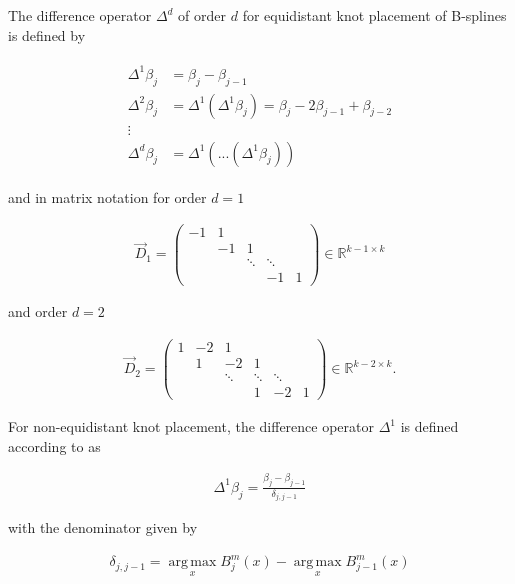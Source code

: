 \documentclass[10pt,a4paper]{report}
\begin{document}
The difference operator  $\Delta^d$ of order $d$ for equidistant knot placement of B-splines is defined by

\begin{align} \label{eq:difference-operators}
	\begin{split}
		\Delta^1 \beta_j &= \beta_j - \beta_{j-1} \\
		\Delta^2 \beta_j &= \Delta^1(\Delta^1 \beta_j) = \beta_j - 2\beta_{j-1} + \beta_{j-2} \\ 
		\vdots \\ 
		\Delta^d \beta_j &= \Delta^1(...(\Delta^1 \beta_j))
	\end{split}
\end{align}

and in matrix notation for order $d=1$

\begin{align} \label{eq:d1-difference-matrix}
	\vec{D}_1 = 
	\begin{pmatrix} 
		-1& 1&       &        &   \\  
		&-1& 1     &        &   \\  
		&  &\ddots & \ddots &   \\ 
		&  &       & -1     & 1 
	\end{pmatrix} \in \mathbb R^{k-1\times k}
\end{align}

and order $d=2$

\begin{align} \label{eq:d2-difference-matrix}
	\vec{D}_2 = 
	\begin{pmatrix} 
		1& -2& 1& &    \\  
		& 1 & -2 & 1& \\ 
		&  & \ddots & \ddots  & \ddots \\ 
		& & & 1 & -2 & 1 
	\end{pmatrix} \in \mathbb R^{k-2\times k}.
\end{align}

For non-equidistant knot placement, the difference operator $\Delta^1$ is defined according to \cite{ferziger2008numerische} as

\begin{align} \label{eq:d1-operator-nonequidistant}
	\Delta^1 \beta_j = \frac{\beta_j - \beta_{j-1}}{\delta_{j, j-1}}
\end{align}

with the denominator given by 

\begin{align} \label{eq:delta-operator}
	\delta_{j, j-1} = \operatorname*{arg\, max}_x B_j^m(x) - \operatorname*{arg\, max}_x B_{j-1}^m(x)
\end{align}
\end{document}
